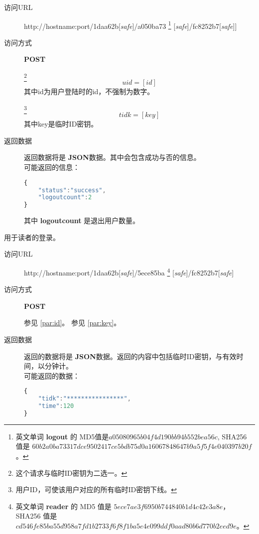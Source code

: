 \documentclass[UTF8]{article}
\def\safe{[\textit{safe}]}
\def\POST{\textbf{POST}}
\def\bfJSON{\textbf{JSON}}
\def\viaurl{\item[访问URL]}
\def\viareq#1{\item[访问方式] #1}
\def\rtdata{\item[返回数据]}
\begin{document}
    \begin{description}
        \viaurl http://hostname:port/1daa62b\safe/a050ba73
        \footnote{
            英文单词 \textbf{logout} 的
            MD5值是$a05080965b04f4d190bb94b552bea56c $,
            SHA256 值是
            $60b2a0ba73317dce9502417ce5bdb75d0a16067848647b9a5f5f4e040397b20f$。
        }
        \safe/fc8252b7\safe]

        \viareq \POST

        \label{par:logout:id}
        \footnote{这个请求与临时ID密钥为二选一。}
        $$uid=[id]$$
        其中id为用户登陆时的id，不强制为数字。

        \label{par:logout:tidk}
        \footnote{用户ID，可使该用户对应的所有临时ID密钥下线。}
        $$tidk=[key]$$
        其中key是临时ID密钥。

        \rtdata 返回数据将是 \bfJSON 数据。其中会包含成功与否的信息。
        \\可能返回的信息：
        \begin{lstlisting}[language=JavaScript]
{
    "status":"success",
    "logoutcount":2
}
        \end{lstlisting}\label{par:logout:example}
        其中 \textbf{logoutcount} 是退出用户数量。
    \end{description}






		用于读者的登录。
		\begin{description}

		\viaurl http://hostname:port/1daa62b\safe/5ece85ba
        \footnote{
            英文单词 \textbf{reader} 的
            MD5 值是
            $5ece7ae3f6950b744840b1d4c42e3a8e$，
            SHA256 值是
            $cd546fe85ba55d958a7fd1b2733f6f8f1ba5e4e099ddf0aad80b6d770b2eed9e$。
            }
        \safe/fc8252b7\safe

        \viareq \POST

         参见 \ref{par:id}。
         参见 \ref{par:key}。
        \rtdata 返回的数据将是 \bfJSON 数据。返回的内容中包括临时ID密钥，与有效时间，以分钟计。
        \\可能返回的数据：
        \begin{lstlisting}[language=JavaScript]
{
    "tidk":"****************",
    "time":120
}
        \end{lstlisting}
		\end{description}
\end{document}

